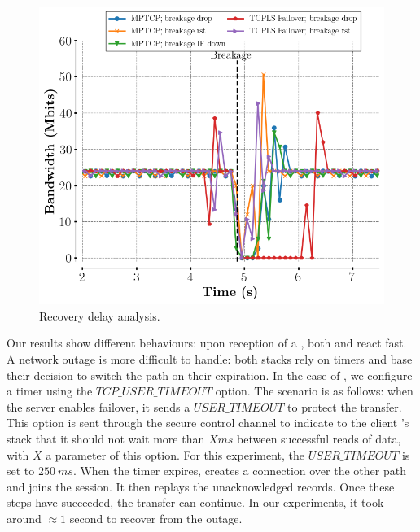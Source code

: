 \begin{figure}[!t]
  \begin{center}
    \includegraphics[width=.8\columnwidth]{figures/breakage_analysis.png}
  \end{center}
\vspace{-0.5cm}
  \caption{Recovery delay analysis.}
  \label{fig:recovery}
\end{figure}

Our results show different behaviours: upon reception of a \rst, both
\tcpls and \mptcp react fast. A network outage
is more difficult to handle: both stacks rely on timers and base their
decision to switch the path on their expiration. In the case of \tcpls, we
configure a timer using the $TCP\_USER\_TIMEOUT$ \tcp option. The scenario is as
follows: when the server enables failover, it sends a $USER\_TIMEOUT$ to protect the transfer. This option is sent through the secure control channel to indicate to the client \tcpls's stack that it should not wait more than $X ms$ between successful reads of data, with $X$ a parameter of this option. For this experiment, the $USER\_TIMEOUT$ is set to $250~ms$. When the timer expires, \tcpls creates a connection over the other path and joins the session. It then replays the unacknowledged records. Once these steps have succeeded, the transfer can continue. In our experiments, it took around $\approx 1$ second to recover from the outage.


